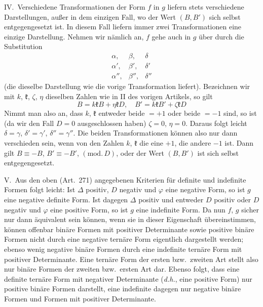 IV.\ Verschiedene Transformationen der Form $f$ in $g$ liefern
stets verschiedene Darstellungen, außer in dem einzigen Fall, wo der Wert
$(B,B')$ sich selbst entgegengesetzt ist. In diesem Fall liefern immer
zwei Transformationen eine einzige Darstellung. Nehmen wir nämlich an,
$f$ gehe auch in $g$ über durch die Substitution
\[
\begin{array}{ccc}
\alpha,&\beta,&\delta\\
\alpha',&\beta',&\delta'\\
\alpha'',&\beta'',&\delta''
\end{array}
\]
(die dieselbe Darstellung wie die vorige Transformation
liefert). Bezeichnen wir mit $k$, $\mathfrak{k}$, $\zeta$, $\eta$ dieselben
Zahlen wie in II des vorigen Artikels, so gilt
\[
B=k\mathfrak{k}B+\eta\mathfrak{k}D,\quad B'=k\mathfrak{k}B'+\zeta\mathfrak{k}D
\]
Nimmt man also an, dass $k$, $\mathfrak{k}$ entweder beide $=+1$ oder
beide $=-1$ sind, so ist (da wir den Fall $D=0$ ausgeschlossen haben)
$\zeta=0$, $\eta=0$. Daraus folgt leicht $\delta=\gamma$, $\delta'=\gamma'$, $\delta''=\gamma''$.
Die beiden Transformationen können also nur dann verschieden sein, wenn
von den Zahlen $k$, $\mathfrak{k}$ die eine $+1$, die andere $-1$
ist. Dann gilt $B\equiv-B$, $B'\equiv-B'$, $(\mathrm{mod.}\,D)$, oder der Wert $(B,B')$ ist
sich selbst entgegengesetzt.

V.\ Aus den oben (Art.\ 271) angegebenen Kriterien für definite und
indefinite Formen folgt leicht: Ist $\Delta$ positiv, $D$ negativ
und $\varphi$ eine negative Form, so ist $g$ eine negative definite
Form. Ist dagegen $\Delta$ positiv und entweder $D$ positiv oder
$D$ negativ und $\varphi$ eine positive Form, so ist $g$ eine
indefinite Form. Da nun $f$, $g$ sicher nur dann äquivalent
sein können, wenn sie in dieser Eigenschaft übereinstimmen, können offenbar
binäre Formen mit positiver Determinante sowie positive binäre Formen
nicht durch eine negative ternäre Form eigentlich dargestellt werden;
ebenso wenig negative binäre Formen durch eine indefinite ternäre Form
mit positiver Determinante. Eine ternäre Form der ersten bzw.\ zweiten
Art stellt also nur binäre Formen der zweiten bzw.\ ersten Art dar.
Ebenso folgt, dass eine definite ternäre Form mit negativer Determinante
(\textit{d.h.}, eine positive Form) nur positive binäre Formen darstellt,
eine indefinite dagegen nur negative binäre Formen und Formen mit
positiver Determinante.

